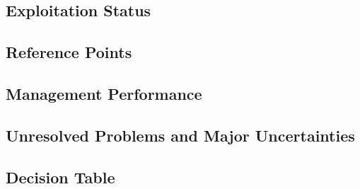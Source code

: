 \documentclass[11pt,
  english,
  a4paper,
]{article}
\begin{document}
\leavevmode\tagmcend\tagstructend


\hypertarget{exploitation-status-1}{%
\subsection*{Exploitation Status}\label{exploitation-status-1}}

\leavevmode\tagmcend\tagstructend


\hypertarget{reference-points-3}{%
\subsection*{Reference Points}\label{reference-points-3}}

\leavevmode\tagmcend\tagstructend


\hypertarget{management-performance-1}{%
\subsection*{Management Performance}\label{management-performance-1}}

\leavevmode\tagmcend\tagstructend


\hypertarget{unresolved-problems-and-major-uncertainties-3}{%
\subsection*{Unresolved Problems and Major Uncertainties}\label{unresolved-problems-and-major-uncertainties-3}}

\leavevmode\tagmcend\tagstructend


\hypertarget{decision-table-1}{%
\subsection*{Decision Table}\label{decision-table-1}}
\end{document}
